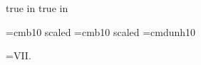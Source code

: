  true in
 true in





\font\boldtitlefont=cmb10 scaled
\font\smallboldtitle=cmb10 scaled 
\font\dun=cmdunh10 %

\footline={\hfil {\tenrm VII.\folio}\hfil}

\def\eps{{\varepsilon}}
\def\Eps{{\epsilon}}
\def\kap{{\kappa}}
\def\lam{{\lambda}}
\def\Lam{{\Lambda}}
\def\mynabla{{\nabla\!}}

\def\underNS{\underline{\NS}}
\def\underR{\underline{\R}}

\def\Bmu{{B_{\mu\nu}}}
\def\Gmu{{G_{\mu\nu}}}

\def\xdot{{\dot x}}
\def\xddot{{\ddot x}}

\def\undertext#1{$\underline{\vphantom{y}\hbox{#1}}$}
\def\nspace{\lineskip=1pt\baselineskip=12pt%
     \lineskiplimit=0pt}
\def\dspace{\lineskip=2pt\baselineskip=18pt%
     \lineskiplimit=0pt}

\def\half{\raise4.5pt\hbox{{\vtop{\ialign{##\crcr
  \hfil\rm $1$\hfil\crcr
   \noalign{\nointerlineskip}--\crcr
   \noalign{\nointerlineskip\vskip-1pt}$2$\crcr}}}}}
\def\third{\raise4.5pt\hbox{{\vtop{\ialign{##\crcr
  \hfil\rm $1$\hfil\crcr
  \noalign{\nointerlineskip}--\crcr
  \noalign{\nointerlineskip\vskip-1pt}$3$\crcr}}}}}
\def\fourth{\raise4.5pt\hbox{{\vtop{\ialign{##\crcr
  \hfil\rm $1$\hfil\crcr
  \noalign{\nointerlineskip}--\crcr
  \noalign{\nointerlineskip\vskip-1pt}$4$\crcr}}}}}
\def\sixth{\raise4.5pt\hbox{{\vtop{\ialign{##\crcr
  \hfil\rm $1$\hfil\crcr
  \noalign{\nointerlineskip}--\crcr
  \noalign{\nointerlineskip\vskip-1pt}$6$\crcr}}}}}
\def\eighth{\raise4.5pt\hbox{{\vtop{\ialign{##\crcr
  \hfil\rm $1$\hfil\crcr
  \noalign{\nointerlineskip}--\crcr
  \noalign{\nointerlineskip\vskip-1pt}$8$\crcr}}}}}

